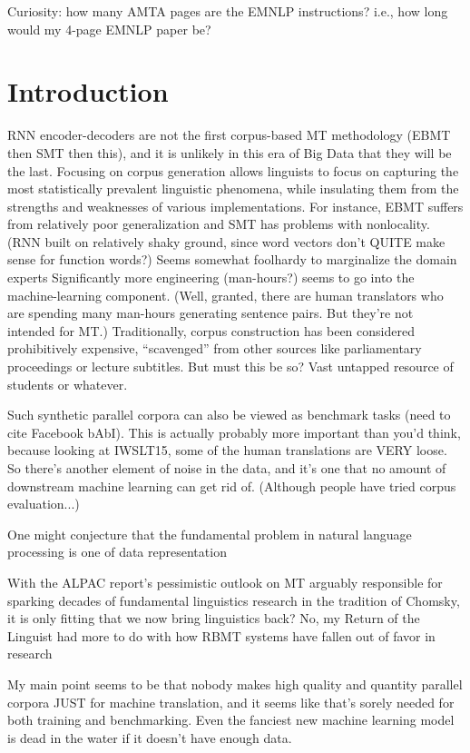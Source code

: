 Curiosity: how many AMTA pages are the EMNLP instructions? i.e., how long would my 4-page EMNLP paper be?


\section{Introduction}

RNN encoder-decoders are not the first corpus-based MT methodology (EBMT then SMT then this), and it is unlikely in this era of Big Data that they will be the last.
Focusing on corpus generation allows linguists to focus on capturing the most statistically prevalent linguistic phenomena, while insulating them from the strengths and weaknesses of various implementations.
For instance, EBMT suffers from relatively poor generalization and SMT has problems with nonlocality.
(RNN built on relatively shaky ground, since word vectors don't QUITE make sense for function words?)
Seems somewhat foolhardy to marginalize the domain experts
Significantly more engineering (man-hours?) seems to go into the machine-learning component.  (Well, granted, there are human translators who are spending many man-hours generating sentence pairs. But they're not intended for MT.)
Traditionally, corpus construction has been considered prohibitively expensive, ``scavenged'' from other sources like parliamentary proceedings or lecture subtitles.
But must this be so? Vast untapped resource of students or whatever.
 
Such synthetic parallel corpora can also be viewed as benchmark tasks (need to cite Facebook bAbI).
This is actually probably more important than you'd think, because looking at IWSLT15, some of the human translations are VERY loose.
So there's another element of noise in the data, and it's one that no amount of downstream machine learning can get rid of.
(Although people have tried corpus evaluation...)

One might conjecture that the fundamental problem in natural language processing is one of data representation

With the ALPAC report's pessimistic outlook on MT arguably responsible for sparking decades of fundamental linguistics research in the tradition of Chomsky, it is only fitting that we now bring linguistics back?
No, my Return of the Linguist had more to do with how RBMT systems have fallen out of favor in research

My main point seems to be that nobody makes high quality and quantity parallel corpora JUST for machine translation, and it seems like that's sorely needed for both training and benchmarking.
Even the fanciest new machine learning model is dead in the water if it doesn't have enough data.

